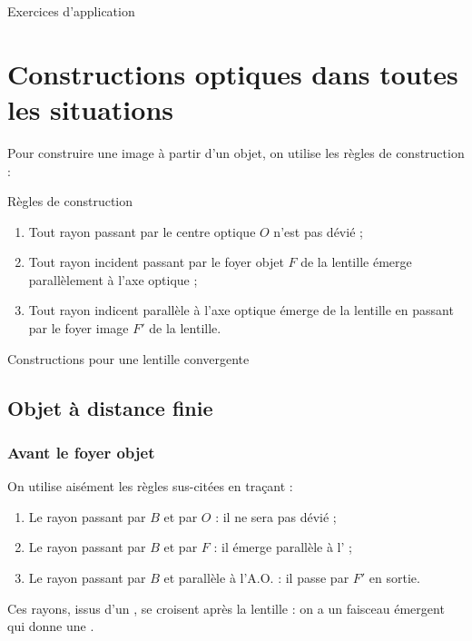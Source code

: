 \documentclass[10pt,a5paper,notitlepage]{book}
\begin{document}
\begin{center}
    \Huge Exercices d'application
\end{center}

\section{Constructions optiques dans toutes les situations}
Pour construire une image à partir d'un objet, on utilise les règles de
construction :

\begin{defi}[label = rconst]{Règles de construction}
    \begin{enumerate}
        \item Tout rayon passant par le centre optique $O$ n'est pas dévié ;
        \item Tout rayon incident passant par le foyer objet $F$ de la lentille
            émerge parallèlement à l'axe optique ;
        \item Tout rayon indicent parallèle à l'axe optique émerge de la
            lentille en passant par le foyer image $F'$ de la lentille.
    \end{enumerate}
\end{defi}

\pagebreak

\begin{center}
    \huge Constructions pour une lentille convergente
\end{center}

\subsection{Objet à distance finie}
\subsubsection{Avant le foyer objet}
On utilise aisément les règles sus-citées en traçant :
\begin{enumerate}
    \item Le rayon passant par $B$ et par $O$ : il ne sera pas dévié ;
    \item Le rayon passant par $B$ et par $F$ : il émerge parallèle à
        l' ;
    \item Le rayon passant par $B$ et parallèle à l'A.O. : il passe par $F'$ en
        sortie.
\end{enumerate}
Ces rayons, issus d'un , se croisent après la lentille :
on a un faisceau émergent  qui donne une .
\end{document}
